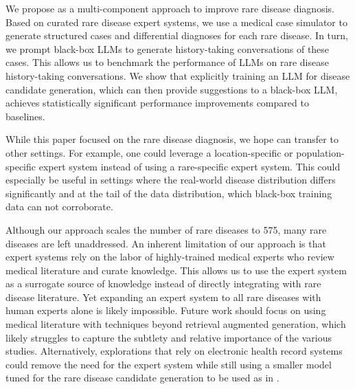 We propose \methodname as a multi-component approach to improve rare disease diagnosis.  Based on curated rare disease expert systems, we use a medical case simulator to generate structured cases and differential diagnoses for each rare disease.  In turn, we prompt black-box LLMs to generate history-taking conversations of these cases.  This allows us to benchmark the performance of LLMs on rare disease history-taking conversations.  We show that   explicitly training an LLM for disease candidate generation, which can then provide suggestions to a black-box LLM, achieves statistically significant performance improvements compared to baselines.


While this paper focused on the rare disease diagnosis, we hope \methodname can transfer to other settings.  For example, one could leverage a location-specific or population-specific expert system instead of using a rare-specific expert system. This could especially be useful in settings where the real-world disease distribution differs significantly and at the tail of the data distribution, which black-box training data can not corroborate.


Although our approach scales the number of rare diseases to 575, many rare diseases \cite{rare_disease_mass_list} are left unaddressed.  An inherent limitation of our approach is that expert systems rely on the labor of highly-trained medical experts who review medical literature and curate knowledge.  This allows us to use the expert system as a surrogate source of knowledge instead of directly integrating with rare disease literature.  Yet expanding an expert system to all rare diseases with human experts alone is likely impossible. Future work should focus on using medical literature with techniques beyond retrieval augmented generation, which likely struggles to capture the subtlety and relative importance of the various studies. Alternatively, explorations that rely on electronic health record systems could remove the need for the expert system while still using a smaller model tuned for the rare disease candidate generation to be used as in \methodname.





